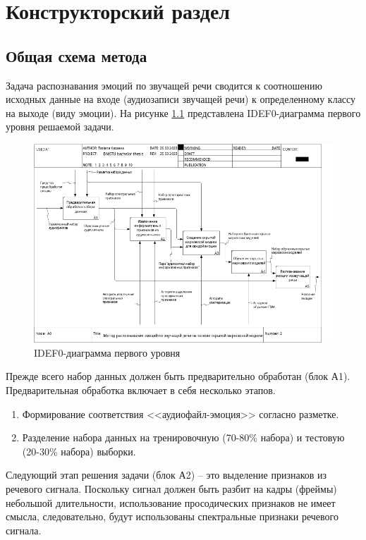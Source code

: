 \chapter{Конструкторский раздел}
\section{Общая схема метода}
Задача распознавания эмоций по звучащей речи сводится к соотношению исходных данные на входе (аудиозаписи звучащей речи) к определенному классу на выходе (виду эмоции). На рисунке \ref{fig:idef1} представлена IDEF0-диаграмма первого уровня решаемой задачи.
\begin{figure}[H]
	\centering
	\includegraphics[width=\linewidth]{assets/02_A0.png}
	\caption{IDEF0-диаграмма первого уровня}
	\label{fig:idef1}
\end{figure}
Прежде всего набор данных должен быть предварительно обработан (блок А1).  Предварительная обработка включает в себя несколько этапов.
\begin{enumerate}
	\item Формирование соответствия <<аудиофайл-эмоция>> согласно разметке.
	\item Разделение набора данных на тренировочную (70-80\% набора) и тестовую (20-30\% набора) выборки. 
\end{enumerate}
Следующий этап решения задачи (блок А2) -- это выделение признаков из речевого сигнала. Поскольку сигнал должен быть разбит на кадры (фреймы) небольшой длительности, использование просодических признаков не имеет смысла, следовательно, будут использованы спектральные признаки речевого сигнала. 

